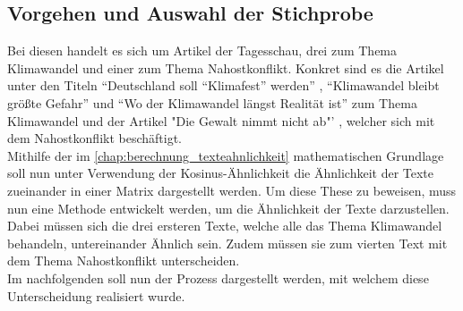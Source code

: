 \subsection{Vorgehen und Auswahl der Stichprobe}
Bei diesen handelt es sich um Artikel der Tagesschau, drei zum Thema Klimawandel und einer zum Thema Nahostkonflikt. Konkret sind es die Artikel unter den Titeln "`Deutschland soll "`Klimafest"' werden"' \cite[]{tag_klima_klimafest}, "`Klimawandel bleibt größte Gefahr"' \cite[]{tag_klima_gefahr} und "`Wo der Klimawandel längst Realität ist"' \cite[]{tag_klima_realiteat} zum Thema Klimawandel und der Artikel "Die Gewalt nimmt nicht ab"' \cite[]{tag_nahost}, welcher sich mit dem Nahostkonflikt beschäftigt. \\ \newline
Mithilfe der im \autoref{chap:berechnung_texteahnlichkeit} mathematischen Grundlage soll nun unter Verwendung der Kosinus-Ähnlichkeit die Ähnlichkeit der Texte zueinander in einer Matrix dargestellt werden. Um diese These zu beweisen, muss nun eine Methode entwickelt werden, um die Ähnlichkeit der Texte darzustellen. Dabei müssen sich die drei ersteren Texte, welche alle das Thema Klimawandel behandeln, untereinander Ähnlich sein. Zudem müssen sie zum vierten Text mit dem Thema Nahostkonflikt unterscheiden. \\ \newline
Im nachfolgenden soll nun der Prozess dargestellt werden, mit welchem diese Unterscheidung realisiert wurde.
